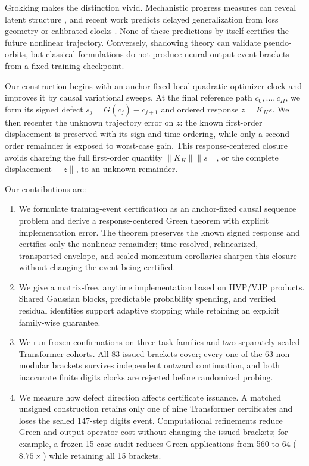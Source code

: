 \documentclass{article}
\begin{document}
Grokking makes the distinction vivid.  Mechanistic progress measures can reveal
latent structure \citep{nanda2023progress}, and recent work predicts delayed
generalization from loss geometry or calibrated clocks
\citep{notsawo2023predicting,kim2026clock,khanh2026firstpassage}.  None of these
predictions by itself certifies the future nonlinear trajectory.  Conversely,
shadowing theory can validate pseudo-orbits, but classical formulations do not
produce neural output-event brackets from a fixed training checkpoint.

Our construction begins with an anchor-fixed local quadratic optimizer clock
and improves it by causal variational sweeps.  At the final reference path
$c_0,\ldots,c_H$, we form its signed defect $s_j=G(c_j)-c_{j+1}$ and
ordered response $z=K_Hs$.  We then recenter the unknown trajectory error on
$z$: the known first-order displacement is preserved with its sign and time
ordering, while only a second-order remainder is exposed to worst-case gain.
This response-centered closure avoids charging the full first-order quantity
$\lVert K_H\rVert\lVert s\rVert$, or the complete displacement $\|z\|$, to an
unknown remainder.

Our contributions are:
\begin{enumerate}
  \item We formulate training-event certification as an anchor-fixed causal
  sequence problem and derive a response-centered Green theorem with explicit
  implementation error.  The theorem preserves the known signed response and
  certifies only the nonlinear remainder; time-resolved, relinearized,
  transported-envelope, and scaled-momentum corollaries sharpen
  this closure without changing the event being certified.
  \item We give a matrix-free, anytime implementation based on HVP/VJP
  products.  Shared Gaussian blocks, predictable probability spending, and
  verified residual identities support adaptive stopping while retaining an
  explicit family-wise guarantee.
  \item We run frozen confirmations on three task families and two separately
  sealed Transformer cohorts.  All 83 issued brackets cover; every one of the
  63 non-modular brackets survives independent outward continuation, and
  both inaccurate finite digits clocks are rejected before randomized probing.
  \item We measure how defect direction affects certificate issuance.  A matched unsigned
  construction retains only one of nine Transformer certificates and loses the
  sealed 147-step digits event.  Computational refinements reduce Green and
  output-operator cost without changing the issued brackets; for example, a
  frozen 15-case audit reduces Green applications from 560 to 64
  ($8.75\times$) while retaining all 15 brackets.
\end{enumerate}
\end{document}
